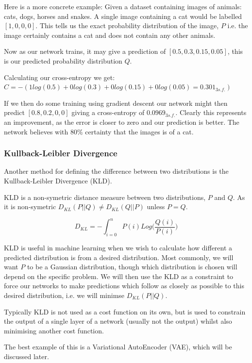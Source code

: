Here is a more concrete example:
Given a dataset containing images of animals: cats, dogs, horses and snakes. A single image containing a cat would be labelled $[1, 0, 0, 0]$. This tells us the exact probability distribution of the image, $P$ i.e. the image certainly contains a cat and does not contain any other animals.

Now as our network trains, it may give a prediction of $[0.5, 0.3, 0.15, 0.05]$, this is our predicted probability distribution $Q$.

Calculating our cross-entropy we get:
$C = -(1 log(0.5) + 0 log(0.3) + 0 log(0.15) + 0 log(0.05) = 0.301_{3s.f.})$


If we then do some training using gradient descent our network might then predict $[0.8, 0.2, 0, 0]$ giving a cross-entropy of $0.0969_{3s.f.}$. Clearly this represents an improvement, as the error is closer to zero and our prediction is better. The network believes with 80\% certainty that the images is of a cat. 


\subsubsection{Kullback-Leibler Divergence}

Another method for defining the difference between two distributions is the Kullback-Leibler Divergence (KLD).

KLD is a non-symetric distance measure between two distributions, $P$ and $Q$. As it is non-symetric $D_{KL}(P||Q) \neq D_{KL}(Q||P)$ unless $P = Q$.

\begin{equation} \label{eqn:kld}
D_{KL} = -\int_{i=0}^{n}{P(i)Log(\frac{Q(i)}{P(i)}})
\end{equation}

KLD is useful in machine learning when we wish to calculate how different a predicted distribution is from a desired distribution. Most commonly, we will want $P$ to be a Gaussian distribution, though which distribution is chosen will depend on the specific problem. We will then use the KLD as a constraint to force our networks to make predictions which follow as closely as possible to this desired distribution, i.e. we will minimse $D_{KL}(P||Q)$.

Typically KLD is not used as a cost function on its own, but is used to constrain the output of a single layer of a network (usually not the output) whilst also minimising another cost function.

The best example of this is a Variational AutoEncoder (VAE), which will be discussed later.


